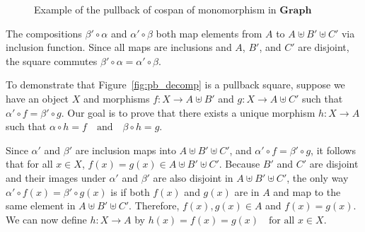 \begin{example}
\begin{figure}[H]
\begin{center}
{
    }
\end{center}
\caption{Example of the pullback of cospan of monomorphism in \(\mathbf{Graph}\)}
\label{fig:ex:pb_in_graph}
\end{figure}
\end{example}

The compositions \( \beta' \circ \alpha \) and \( \alpha' \circ \beta \) both map elements from \( A \) to \( A \uplus B' \uplus C' \) via inclusion function.
Since all maps are inclusions and \( A \), \( B' \), and \( C' \) are disjoint, the square commutes $
     \beta' \circ \alpha \mathop{=} \alpha' \circ \beta 
$. 

To demonstrate that Figure~\ref{fig:pb_decomp} is a pullback square, suppose we have an object \( X \) and morphisms \( f: X \mathop{\to} A \uplus B' \) and \( g: X \mathop{\to} A \uplus C' \) such that
$
\alpha' \circ f \mathop{=} \beta' \circ g.
$
Our goal is to prove that there exists a unique morphism \( h: X \mathop{\to} A \) such that
$
\alpha \circ h \mathop{=} f \quad \text{and} \quad \beta \circ h \mathop{=} g.
$

Since \( \alpha' \) and \( \beta' \) are inclusion maps into \( A \uplus B' \uplus C' \), and \( \alpha' \circ f \mathop{=} \beta' \circ g \), it follows that for all \( x \mathop{\in} X \),
$
f(x) \mathop{=} g(x) \mathop{\in} A \uplus B' \uplus C'.
$
Because \( B' \) and \( C' \) are disjoint and their images under \( \alpha' \) and \( \beta' \) are also disjoint in \( A \uplus B' \uplus C' \), the only way \( \alpha' \circ f(x) \mathop{=} \beta' \circ g(x) \) is if both \( f(x) \) and \( g(x) \) are in \( A \) and map to the same element in \( A \uplus B' \uplus C' \).
Therefore, \( f(x), g(x) \mathop{\in} A \) and \( f(x) \mathop{=} g(x) \).
We can now define \( h: X \mathop{\to} A \) by
$
h(x) \mathop{=} f(x) \mathop{=} g(x) \quad \text{for all } x \mathop{\in} X.
$


